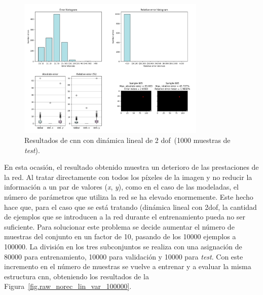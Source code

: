 \begin{figure}[H]
		\begin{center}
			\includegraphics[width=0.8\textwidth]{ figures/test_raw/NOREC/linear_var_10000.png}
			\caption{Resultados de \acrshort{cnn} con dinámica lineal de 2 \acrshort{dof}~(1000 muestras de \textit{test}).}
			\label{fig.raw_norec_lin_var_10000}
		\end{center}
\end{figure}
\vspace{-10pt}

En esta ocasión, el resultado obtenido muestra un deterioro de las prestaciones de la red. Al tratar directamente con todos los píxeles de la imagen y no reducir la información a un par de valores (\textit{x}, \textit{y}), como en el caso de las modeladas, el número de parámetros que utiliza la red se ha elevado enormemente. Este hecho hace que, para el caso que se está tratando (dinámica lineal con 2\acrshort{dof}, la cantidad de ejemplos que se introducen a la red durante el entrenamiento pueda no ser suficiente. Para solucionar este problema  se decide aumentar el número de muestras del conjunto en un factor de 10, pasando de los 10000 ejemplos a 100000. La división en los tres subconjuntos se realiza con una asignación de 80000 para entrenamiento, 10000 para validación y 10000 para \textit{test}. Con este incremento en el número de muestras se vuelve a entrenar y a evaluar la misma estructura \acrshort{cnn}, obteniendo los resultados de la Figura~\ref{fig.raw_norec_lin_var_100000}.

